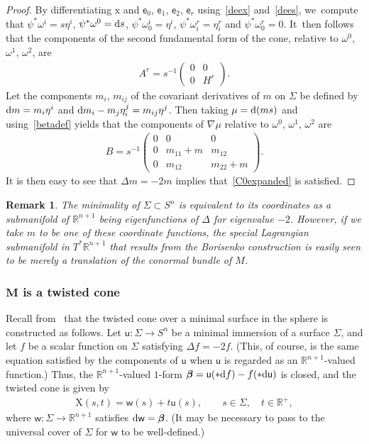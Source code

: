 \documentclass[10pt,a4paper]{amsart}
\def\R{\mathbb{R}}
\def\ve{\mathsf{e}}
\def\vx{\boldsymbol{\mathrm{x}}}
\def\vw{\mathsf{w}}
\def\vu{\mathsf{u}}
\def\vbeta{\boldsymbol{\beta}}
\def\vX{\boldsymbol{\mathrm{X}}}
\def\w{\omega}
\newtheorem{Remark}[Theorem]{Remark}}
\numberwithin{equation}{section}
\begin{document}
\begin{proof}
By differentiating $\vx$ and $\ve_0$, $\ve_1$, $\ve_2$, $\ve_r$ using~\eqref{deex} and~\eqref{dees}, we~compute that $\psi^* \w^i = s \eta^i$, $\psi^*\w^0 = {\rm d}s$, $\psi^* \w^i_0 = \eta^i$, $\psi^* \w^r_i = \eta^r_i$ and $\psi^* \w^r_0 = 0$. It~then follows that the components of the second fundamental form of the cone, relative to $\w^0$, $\w^1$, $\w^2$, are
\begin{gather*}
A^r = s^{-1}\begin{pmatrix} 0 & 0 \\ 0 & H^r \end{pmatrix} .
\end{gather*}
Let the components $m_i$, $m_{ij}$ of the covariant derivatives of $m$ on $\Sigma$ be defined by ${\rm d}m = m_i \eta^i$ and ${\rm d}m_i - m_j \eta^j_i = m_{ij} \eta^j$. Then taking $\mu = {\rm d}(ms)$ and using~\eqref{betadef} yields that the components of $\nabla\mu$ relative to $\w^0$, $\w^1$, $\w^2$ are
\begin{gather*}
B = s^{-1}\begin{pmatrix} 0 & 0 & 0 \\
0 & m_{11}+m & m_{12} \\ 0 & m_{12} & m_{22} + m \end{pmatrix} .
\end{gather*}
It is then easy to see that $\Delta m = - 2 m$ implies that~\eqref{C0expanded} is satisfied.
\end{proof}

\begin{Remark}
The minimality of $\Sigma \subset S^n$ is equivalent to its coordinates as a submanifold of $\R^{n+1}$ being eigenfunctions of $\Delta$ for eigenvalue $-2$. However, if we take $m$ to be one of these coordinate functions, the special Lagrangian submanifold in $T^* \R^{n+1}$ that results from the Borisenko construction is easily seen to be merely a translation of the conormal bundle of $M$.
\end{Remark}

\subsubsection[M is a twisted cone]
{$\boldsymbol M$ is a twisted cone} \label{twistconesec}

Recall from~\cite{Br} that the twisted cone over a minimal surface in the sphere is constructed as follows. Let $\vu\colon \Sigma \to S^n$ be a minimal immersion of a surface $\Sigma$, and let $f$ be a scalar function on $\Sigma$ satisfying $\Delta f = -2f$. (This, of course, is the same equation satisfied by the components of $\vu$ when $\vu$ is regarded as an $\R^{n+1}$-valued function.) Thus, the $\R^{n+1}$-valued $1$-form $\vbeta = \vu (*{\rm d}f) - f (*{\rm d}\vu)$ is closed, and the twisted cone is given by
\begin{gather} \label{twistyform}
\vX(s,t) = \vw(s) + t \vu(s), \qquad
s\in \Sigma, \quad t\in\R^+,
\end{gather}
where $\vw\colon \Sigma \to \R^{n+1}$ satisfies ${\rm d}\vw = \vbeta$. (It may be necessary to pass to the universal cover of $\Sigma$ for $\vw$ to be well-defined.)
\end{document}
